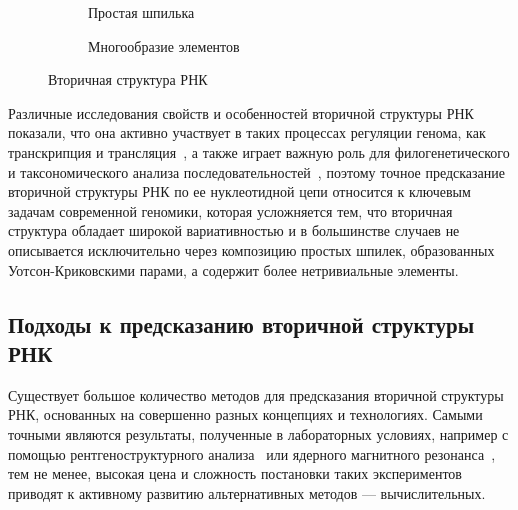 \begin{figure}[h]
\centering
\begin{subfigure}{.5\textwidth}
  \centering
  \caption{Простая шпилька}
  \label{rna_a}
\end{subfigure}%
\begin{subfigure}{.5\textwidth}
  \centering
  \caption{Многообразие элементов}
  \label{rna_b}
\end{subfigure}
\caption{Вторичная структура РНК}
\label{rna}
\end{figure}

Различные исследования свойств и особенностей вторичной структуры РНК показали, что она активно участвует в таких процессах регуляции генома, как транскрипция и трансляция~\cite{wada1986local}, а также играет важную роль для филогенетического и таксономического анализа последовательностей~\cite{vrehakova2014variation,miladi2017rnascclust}, поэтому точное предсказание вторичной структуры РНК по ее нуклеотидной цепи относится к ключевым задачам современной геномики, которая усложняется тем, что вторичная структура обладает широкой вариативностью и в большинстве случаев не описывается исключительно через композицию простых шпилек, образованных Уотсон-Криковскими парами, а содержит более нетривиальные элементы.

\subsection{Подходы к предсказанию вторичной структуры РНК}
Существует большое количество  методов для предсказания вторичной структуры РНК, основанных на совершенно разных концепциях и технологиях. Самыми точными являются результаты, полученные в лабораторных условиях, например с помощью рентгеноструктурного анализа~\cite{westhof2015twenty} или ядерного магнитного резонанса~\cite{furtig2003nmr}, тем не менее, высокая цена и сложность постановки таких экспериментов приводят к активному развитию альтернативных методов --- вычислительных.

